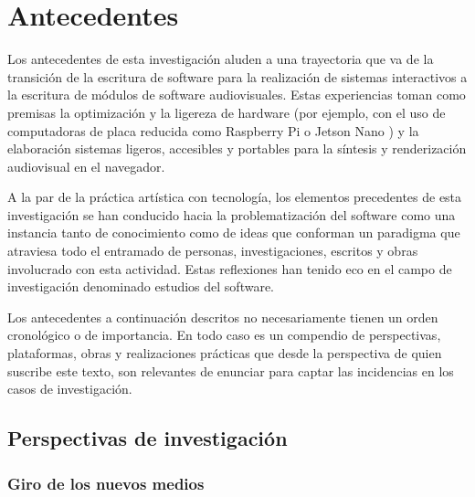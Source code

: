 
\chapter{Antecedentes}



Los antecedentes de esta investigación aluden a una trayectoria que va de la transición de la escritura de software para la realización de sistemas interactivos a la escritura de módulos de software audiovisuales. Estas experiencias toman como premisas la optimización y la ligereza de hardware (por ejemplo, con el uso de computadoras de placa reducida como Raspberry Pi o Jetson Nano ) y la elaboración sistemas ligeros, accesibles y portables para la síntesis y renderización audiovisual en el navegador.

A la par de la práctica artística con tecnología, los elementos precedentes de esta investigación se han conducido hacia la problematización del software como una instancia tanto de conocimiento como de ideas que conforman un paradigma que atraviesa todo el entramado de personas, investigaciones, escritos y obras involucrado con esta actividad. Estas reflexiones han tenido eco en el campo de investigación denominado estudios del software.

Los antecedentes a continuación descritos no necesariamente tienen un orden cronológico o de importancia. En todo caso es un compendio de perspectivas, plataformas, obras y realizaciones prácticas que desde la perspectiva de quien suscribe este texto, son relevantes de enunciar para captar las incidencias en los casos de investigación. 

\section{Perspectivas de investigación}

\subsection{Giro de los nuevos medios}

